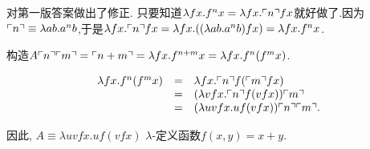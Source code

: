 \begin{solution}
{\color {red} {对第一版答案做出了修正.}}
只要知道$\lambda fx.f^n x = \lambda fx. \ulcorner{n}\urcorner fx$就好做了.因为$\ulcorner{n}\urcorner \equiv \lambda ab.a^nb$,于是$\lambda fx. \ulcorner{n}\urcorner fx=\lambda fx. ((\lambda ab.a^nb)fx)=\lambda fx. f^nx$.

构造$A \ulcorner{n}\urcorner \ulcorner{m}\urcorner = \ulcorner{n+m}\urcorner =\lambda fx. f^{n+m}x= \lambda fx. f^n (f^m x)$.

\[
 \begin{array}{rcl}
  \lambda fx. f^n (f^m x) & = & \lambda fx. \ulcorner{n}\urcorner f (\ulcorner{m}\urcorner f x) \\
  & = & (\lambda vfx. \ulcorner{n}\urcorner f (vf x))\ulcorner{m}\urcorner \\
  & = & (\lambda uvfx. uf (vf x))\ulcorner{n}\urcorner\ulcorner{m}\urcorner.
 \end{array}
\]

因此, $A \equiv \lambda uvfx. uf(vfx)$ $\lambda$-定义函数$f(x,y)=x+y$.
\end{solution}